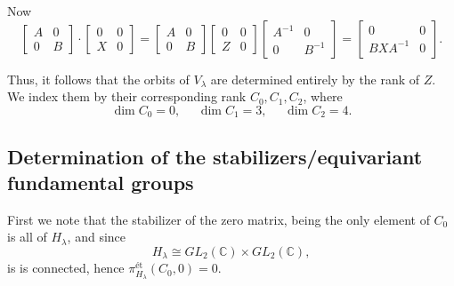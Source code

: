 \documentclass{memoir}
\newcommand{\bc}{\mathbb{C}}
\newcommand{\tx}{\text}
\theoremstyle{definition}
\begin{document}
	Now
	$$\begin{bmatrix}
		A & 0 \\
		0 & B
	\end{bmatrix}\cdot\begin{bmatrix}
		0 & 0 \\
		X & 0 
	\end{bmatrix}=\begin{bmatrix}
		A & 0 \\
		0 & B
	\end{bmatrix}\begin{bmatrix}
		0 & 0 \\
		Z & 0 
	\end{bmatrix}\begin{bmatrix}
		A^{-1} & 0 \\
		0 & B^{-1}
	\end{bmatrix}=\begin{bmatrix}
		0 & 0 \\
		BXA^{-1} & 0
	\end{bmatrix}.$$
	
	Thus, it follows that the orbits of $V_\lambda$ are determined entirely by the rank of $Z$.  
	We index them by their corresponding rank $C_0, C_1, C_2$, where 
	$$\dim C_0=0, \ \ \ \ \ \ \dim C_1=3, \ \ \ \ \ \ \dim C_2=4.$$
	
	
	
	
	
	
	
	
	
	
	
	
	
	
	
	
	
	
	
	
	
	\subsection{Determination of the stabilizers/equivariant fundamental groups}
	
	First we note that the stabilizer of the zero matrix, being the only element of $C_0$ is all of $H_\lambda$, and since
	$$H_\lambda\cong GL_2(\bc)\times GL_2(\bc),$$
	is is connected, hence $\pi_{H_\lambda}^{\tx{\'et}}(C_0, 0)=0$.  
	
\end{document}
